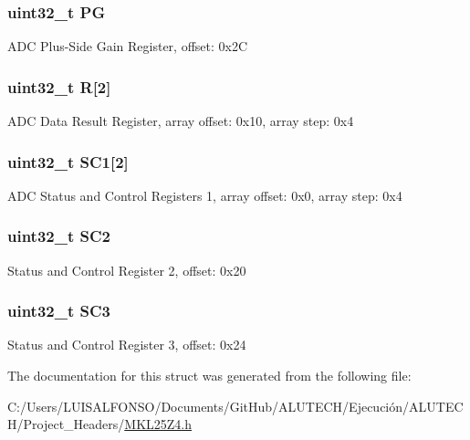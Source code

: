 \subsubsection[{P\+G}]{\setlength{\rightskip}{0pt plus 5cm}uint32\+\_\+t P\+G}\label{struct_a_d_c___mem_map_aced9d6037d771813e327ae3924bc4f6a}
A\+D\+C Plus-\/\+Side Gain Register, offset\+: 0x2\+C \hypertarget{struct_a_d_c___mem_map_a4842350fea7d6ad275fccc0396f05feb}{}
\subsubsection[{R}]{\setlength{\rightskip}{0pt plus 5cm}uint32\+\_\+t R\mbox{[}2\mbox{]}}\label{struct_a_d_c___mem_map_a4842350fea7d6ad275fccc0396f05feb}
A\+D\+C Data Result Register, array offset\+: 0x10, array step\+: 0x4 \hypertarget{struct_a_d_c___mem_map_a076d9aea70802056237207e2503e8a52}{}
\subsubsection[{S\+C1}]{\setlength{\rightskip}{0pt plus 5cm}uint32\+\_\+t S\+C1\mbox{[}2\mbox{]}}\label{struct_a_d_c___mem_map_a076d9aea70802056237207e2503e8a52}
A\+D\+C Status and Control Registers 1, array offset\+: 0x0, array step\+: 0x4 \hypertarget{struct_a_d_c___mem_map_a1399484db9fbc995729c65d45e3b2557}{}
\subsubsection[{S\+C2}]{\setlength{\rightskip}{0pt plus 5cm}uint32\+\_\+t S\+C2}\label{struct_a_d_c___mem_map_a1399484db9fbc995729c65d45e3b2557}
Status and Control Register 2, offset\+: 0x20 \hypertarget{struct_a_d_c___mem_map_a811b861e1df65459f3a67a73255cc96b}{}
\subsubsection[{S\+C3}]{\setlength{\rightskip}{0pt plus 5cm}uint32\+\_\+t S\+C3}\label{struct_a_d_c___mem_map_a811b861e1df65459f3a67a73255cc96b}
Status and Control Register 3, offset\+: 0x24 

The documentation for this struct was generated from the following file\+:\begin{DoxyCompactItemize}
\item 
C\+:/\+Users/\+L\+U\+I\+S\+A\+L\+F\+O\+N\+S\+O/\+Documents/\+Git\+Hub/\+A\+L\+U\+T\+E\+C\+H/\+Ejecución/\+A\+L\+U\+T\+E\+C\+H/\+Project\+\_\+\+Headers/\hyperlink{_m_k_l25_z4_8h}{M\+K\+L25\+Z4.\+h}\end{DoxyCompactItemize}
